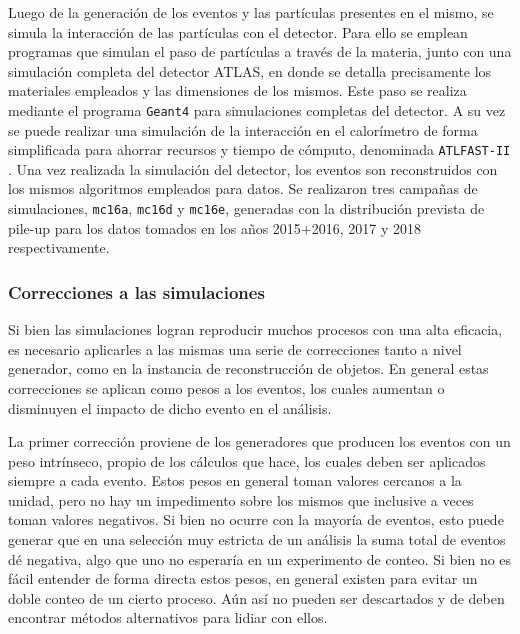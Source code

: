Luego de la generación de los eventos y las partículas presentes en el mismo, se simula la interacción de las partículas con el detector. 
Para ello se emplean programas que simulan el paso de partículas a través de la materia, junto con una simulación completa del detector ATLAS, en donde se detalla precisamente los materiales empleados y las dimensiones de los mismos. Este paso se realiza mediante el programa \texttt{Geant4} \cite{Geant4} para simulaciones completas del detector. A su vez se puede realizar una simulación de la interacción en el calorímetro de forma simplificada para ahorrar recursos y tiempo de cómputo, denominada \texttt{ATLFAST-II} \cite{Richter-Was:683751,Lukas_2012}. Una vez realizada la simulación del detector, los eventos son reconstruidos con los mismos algoritmos empleados para datos. Se realizaron tres campañas de simulaciones, \texttt{mc16a}, \texttt{mc16d} y \texttt{mc16e}, generadas con la distribución prevista de pile-up para los datos tomados en los años 2015+2016, 2017 y 2018 respectivamente.






\subsubsection{Correcciones a las simulaciones}\label{sec:mc_weights}

Si bien las simulaciones logran reproducir muchos procesos con una alta eficacia, es necesario aplicarles a las mismas una serie de correcciones tanto a nivel generador, como en la instancia de reconstrucción de objetos. En general estas correcciones se aplican como pesos a los eventos, los cuales aumentan o disminuyen el impacto de dicho evento en el análisis.

La primer corrección proviene de los generadores que producen los eventos con un peso intrínseco, propio de los cálculos que hace, los cuales deben ser aplicados siempre a cada evento. Estos pesos en general toman valores cercanos a la unidad, pero no hay un impedimento sobre los mismos que inclusive a veces toman valores negativos. Si bien no ocurre con la mayoría de eventos, esto puede generar que en una selección muy estricta de un análisis la suma total de eventos dé negativa, algo que uno no esperaría en un experimento de conteo. Si bien no es fácil entender de forma directa estos pesos, en general existen para evitar un doble conteo de un cierto proceso. Aún así no pueden ser descartados y de deben encontrar métodos alternativos para lidiar con ellos.

